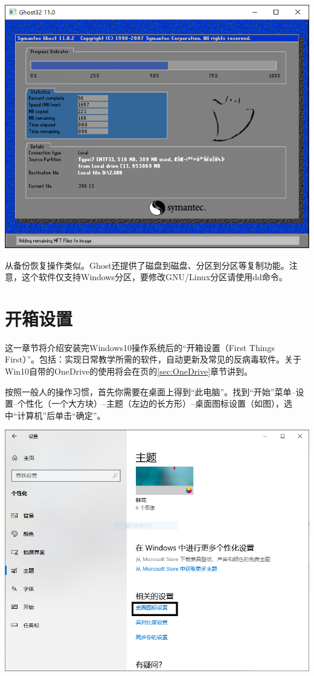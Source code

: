 \begin{center}
	\includegraphics[scale=0.6]{pic/sg8}
\end{center}\par
从备份恢复操作类似。Ghost还提供了磁盘到磁盘、分区到分区等复制功能。注意，这个软件仅支持Windows分区，要修改GNU/Linux分区请使用dd命令。
\section{开箱设置}
这一章节将介绍安装完Windows10操作系统后的“开箱设置（First Things First）”。包括：实现日常教学所需的软件，自动更新及常见的反病毒软件。关于Win10自带的OneDrive的使用将会在\pageref{sec:OneDrive}页的\ref{sec:OneDrive}章节讲到。\par
按照一般人的操作习惯，首先你需要在桌面上得到“此电脑”。找到“开始”菜单--设置--个性化（一个大方块）--主题（左边的长方形）--桌面图标设置（如图），选中“计算机”后单击“确定”。
\begin{center}
	\includegraphics[scale=0.6]{pic/WinComp}
\end{center} 
